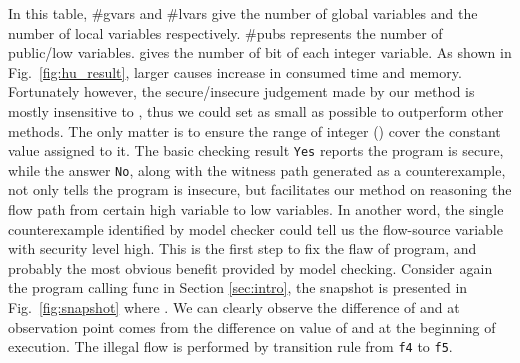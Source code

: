 \documentclass{llncs}
\begin{document}
In this table, \#gvars and \#lvars give the number of global
variables and the number of local variables respectively. \#pubs
represents the number of public/\textsf{low} variables.  gives
the number of bit of each integer variable. As shown in
Fig.~\ref{fig:hu_result}, larger  causes increase in consumed
time and memory. Fortunately however, the secure/insecure judgement
made by our method is mostly insensitive to , thus we could set
 as small as possible to outperform other methods. The only
matter is to ensure the range of integer () cover the
constant value assigned to it. The basic checking result
\texttt{Yes} reports the program is secure, while the answer
\texttt{No}, along with the witness path generated as a
counterexample, not only tells the program is insecure, but
facilitates our method on reasoning the flow path from certain
\textsf{high} variable to \textsf{low} variables. In another word,
the single counterexample identified by model checker could tell us
the flow-source variable with security level \textsf{high}. This is
the first step to fix the flaw of program, and probably the most
obvious benefit provided by model checking. Consider again the
program calling \textsf{func} in Section \ref{sec:intro}, the
snapshot is presented in Fig.~\ref{fig:snapshot} where . We can
clearly observe the difference of  and  at observation point
comes from the difference on value of  and  at the beginning
of execution. The illegal flow is performed by transition rule from
\texttt{f4} to \texttt{f5}.
\end{document}
